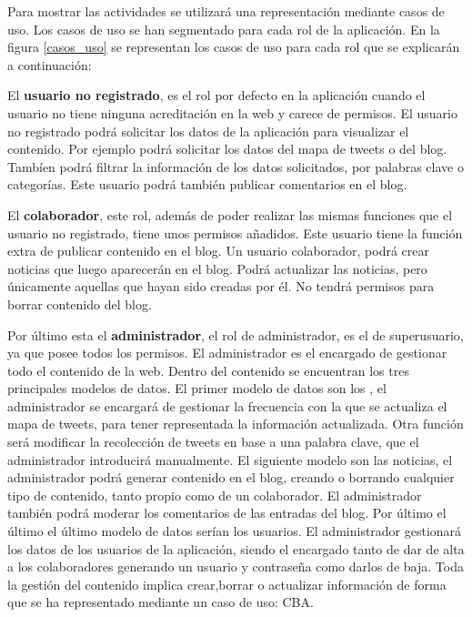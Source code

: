 Para mostrar las actividades se utilizará una representación mediante casos de uso. Los casos de uso se han segmentado para cada rol de la aplicación. En la figura \ref{casos_uso}  se representan los casos de uso para cada rol que se explicarán a continuación:

\vspace{5 mm}

El \textbf{usuario no registrado}, es el rol por defecto en la aplicación cuando el usuario no tiene ninguna acreditación en la web y carece de permisos. El usuario no registrado podrá solicitar los datos de la aplicación para visualizar el contenido. Por ejemplo podrá solicitar los datos del mapa de tweets o del blog. Tambíen podrá filtrar la información de los datos solicitados, por palabras clave o categorías. Este usuario podrá también publicar comentarios en el blog.

\vspace{5 mm}

El \textbf{colaborador}, este rol, además de poder realizar las mismas funciones que el usuario no registrado, tiene unos permisos añadidos. Este usuario tiene la función extra de publicar contenido en el blog. Un usuario colaborador, podrá crear noticias que luego aparecerán en el blog. Podrá actualizar las noticias, pero únicamente aquellas que hayan sido creadas por él. No tendrá permisos para borrar contenido del blog.

\vspace{5 mm}

Por último esta el \textbf{administrador}, el rol de administrador, es el de superusuario, ya que posee todos los permisos. El administrador es el encargado de gestionar todo el contenido de la web. Dentro del contenido se encuentran los tres principales modelos de datos. El primer modelo de datos son los , el administrador se encargará de gestionar la frecuencia con la que se actualiza el mapa de tweets, para tener representada la información actualizada. Otra función será modificar la recolección de tweets en base a una palabra clave, que el administrador introducirá manualmente. El siguiente modelo son las noticias, el administrador podrá generar contenido en el blog, creando o borrando cualquier tipo de contenido, tanto propio como de un colaborador. El administrador también podrá moderar los comentarios de las entradas del blog. Por último el último el último modelo de datos serían los usuarios. El administrador gestionará los datos de los usuarios de la aplicación, siendo el encargado tanto de dar de alta a los colaboradores generando un usuario y contraseña como darlos de baja. Toda la gestión del contenido implica crear,borrar o actualizar información de forma que se ha representado mediante un caso de uso: CBA.


